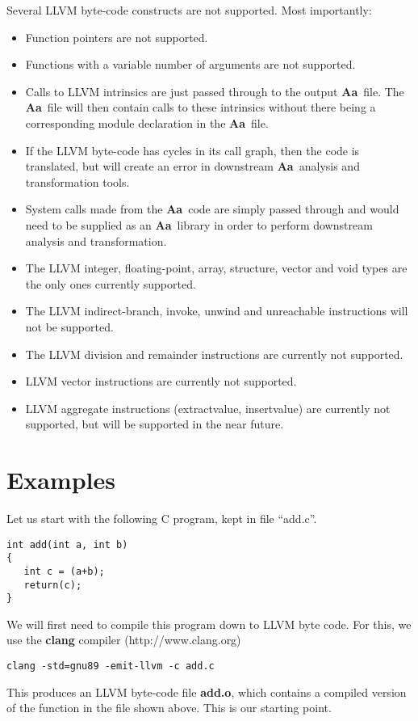 \documentclass{article}
\newcommand{\Aa}{{\bf Aa}~}
\begin{document}
Several LLVM byte-code constructs are not supported.  Most 
importantly:
\begin{itemize}
\item Function pointers are not supported.
\item Functions with a variable number of arguments are not 
supported.
\item Calls to LLVM intrinsics are just passed through to the
output \Aa file.  The \Aa file will then contain calls
to these intrinsics without there being a corresponding
module declaration in the \Aa file.
\item If the LLVM byte-code has cycles in its call graph,
then the code is translated, but will create an error
in downstream \Aa analysis and transformation tools.
\item System calls made from the \Aa code are simply
passed through and would need to be supplied as an
\Aa library in order to perform downstream analysis and
transformation.
\item The LLVM integer, floating-point, array, structure,
vector and void types are the only ones currently supported.
\item The LLVM indirect-branch, invoke, unwind and unreachable
instructions will not be supported.
\item The LLVM division and remainder instructions are currently
not supported. 
\item LLVM vector instructions are currently not supported.
\item LLVM aggregate instructions (extractvalue, insertvalue)
are currently not supported, but will be supported in the
near future.
\end{itemize}

\section{Examples}

Let us start with the following C program, kept
in file ``add.c''.
\begin{verbatim}
int add(int a, int b)
{
   int c = (a+b);
   return(c);
}
\end{verbatim}

We will first need to compile this program down to 
LLVM byte code.  For this, we use the {\bf clang}
compiler (http://www.clang.org)
\begin{verbatim}
clang -std=gnu89 -emit-llvm -c add.c
\end{verbatim}
This produces an LLVM byte-code file {\bf add.o},
which contains a compiled version of the function
in the file shown above.
This is our starting point.
\end{document}
